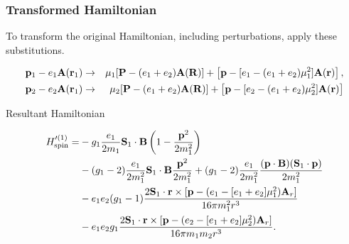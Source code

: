 \documentclass[11ppt]{beamer}
\newcommand{\beqa}{\begin{eqnarray*} }
\newcommand{\eeqa}{\end{eqnarray*} }
\newcommand{\beq}{\begin{equation*} }
\newcommand{\eeq}{\end{equation*} }
\begin{document}
\begin{frame}
\frametitle{Transformed Hamiltonian}

\footnotesize

To transform the original Hamiltonian, including perturbations, apply these substitutions.

\beqa
	\v{p}_1 - e_1 \v{A}(\v{r}_1) &\to&	 \mu_1 [ \v{P} - (e_1 + e_2)\v{A}(\v{R}) ] +  \left[\v{p} - [e_1 -(e_1+e_2)\mu_1^2  ] \v{A}(\v{r}) \right ],	\\
	\v{p}_2 -e_2 \v{A}(\v{r}_1) &\to&	\mu_2	 [ \v{P} - (e_1 + e_2)\v{A}(\v{R}) ] +  \left[\v{p} - [e_2 -(e_1+e_2)\mu_2^2  ] \v{A}(\v{r}) \right ]	
\eeqa
\begin{block}{Resultant Hamiltonian}

\beq \label{eq:Br:H}
\begin{split}
 H'^{(1)}_\text{spin} =&
 -g_1 \frac{e_1}{2m_1} \v{S}_1 \cdot \v{B} \left( 1 - \frac{ \v{p}^2 }{2m_1^2} \right )
		\\& -(g_1-2) \frac{e_1}{2m^2_1} \v{S}_1 \cdot \v{B} \frac{\v{p}^2 }{2m_1^2} 
		 + (g_1-2)  \frac{e_1}{2m^2_1} \frac{( \v{p} \cdot \v{B})(\v{S}_1 \cdot \v{p} )}{2m_1^2}
		\\& -e_1 e_2 (g_1 -1) \frac{ 2 \v{S}_1 \cdot \v{r} \times [\v{p} - (e_1-[e_1 + e_2]\mu_1^2 )\v{A}_r ] }{16 \pi m_1^2 r^3}
		\\& -e_1 e_2 g_1 \frac{ 2 \v{S}_1 \cdot \v{r} \times [\v{p} -(e_2-[e_1 + e_2]\mu_2^2 ) \v{A}_r ] }{16 \pi m_1 m_2 r^3}.
\end{split}
\eeq
\normalsize
\end{block}


\end{frame}
\end{document}
